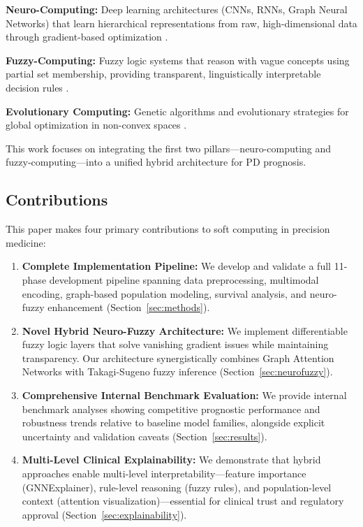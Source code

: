 \documentclass[conference]{IEEEtran}
\begin{document}
\textbf{Neuro-Computing:} Deep learning architectures (CNNs, RNNs, Graph Neural Networks) that learn hierarchical representations from raw, high-dimensional data through gradient-based optimization \cite{lecun2015deep}.

\textbf{Fuzzy-Computing:} Fuzzy logic systems that reason with vague concepts using partial set membership, providing transparent, linguistically interpretable decision rules \cite{zadeh1965fuzzy}.

\textbf{Evolutionary Computing:} Genetic algorithms and evolutionary strategies for global optimization in non-convex spaces \cite{goldberg1989genetic}.

This work focuses on integrating the first two pillars---neuro-computing and fuzzy-computing---into a unified hybrid architecture for PD prognosis.

\subsection{Contributions}

This paper makes four primary contributions to soft computing in precision medicine:

\begin{enumerate}
    \item \textbf{Complete Implementation Pipeline:} We develop and validate a full 11-phase development pipeline spanning data preprocessing, multimodal encoding, graph-based population modeling, survival analysis, and neuro-fuzzy enhancement (Section~\ref{sec:methods}).
    
    \item \textbf{Novel Hybrid Neuro-Fuzzy Architecture:} We implement differentiable fuzzy logic layers that solve vanishing gradient issues while maintaining transparency. Our architecture synergistically combines Graph Attention Networks with Takagi-Sugeno fuzzy inference (Section~\ref{sec:neurofuzzy}).
    
    \item \textbf{Comprehensive Internal Benchmark Evaluation:} We provide internal benchmark analyses showing competitive prognostic performance and robustness trends relative to baseline model families, alongside explicit uncertainty and validation caveats (Section~\ref{sec:results}).
    
    \item \textbf{Multi-Level Clinical Explainability:} We demonstrate that hybrid approaches enable multi-level interpretability---feature importance (GNNExplainer), rule-level reasoning (fuzzy rules), and population-level context (attention visualization)---essential for clinical trust and regulatory approval (Section~\ref{sec:explainability}).
\end{enumerate}
\end{document}
